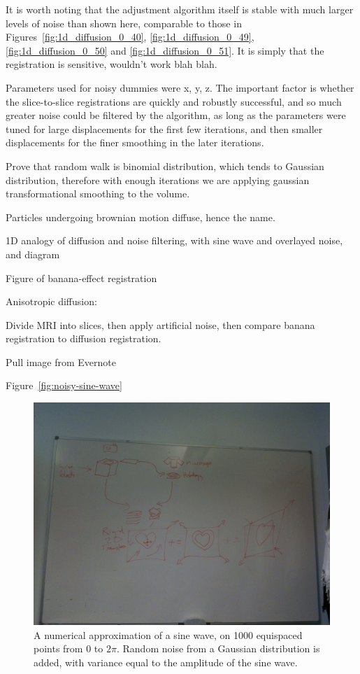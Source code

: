   
  
  It is worth noting that the adjustment algorithm itself is stable with much larger levels of noise than shown here, comparable to those in Figures~\ref{fig:1d_diffusion_0_40}, \ref{fig:1d_diffusion_0_49}, \ref{fig:1d_diffusion_0_50} and \ref{fig:1d_diffusion_0_51}. It is simply that the registration is sensitive, wouldn't work blah blah.
  
  Parameters used for noisy dummies were x, y, z. The important factor is whether the slice-to-slice registrations are quickly and robustly successful, and so much greater noise could be filtered by the algorithm, as long as the parameters were tuned for large displacements for the first few iterations, and then smaller displacements for the finer smoothing in the later iterations.
  
  Prove that random walk is binomial distribution, which tends to Gaussian distribution, therefore with enough iterations we are applying gaussian transformational smoothing to the volume.
  
  Particles undergoing brownian motion diffuse, hence the name.
  
  1D analogy of diffusion and noise filtering, with sine wave and overlayed noise, and diagram
  
  Figure of banana-effect registration
  
  Anisotropic diffusion: 
  
  Divide MRI into slices, then apply artificial noise, then compare banana registration to diffusion registration.
  
  Pull image from Evernote
  
  
  
      Figure~\ref{fig:noisy-sine-wave}
      \begin{figure}[htbp]
        \centering
        \includegraphics[height=0.7\textwidth]{Ch6/Figs/process_diagram}
        \caption{A numerical approximation of a sine wave, on 1000 equispaced points from $0$ to $2\pi$. Random noise from a Gaussian distribution is added, with variance equal to the amplitude of the sine wave.}
      \end{figure}
    
